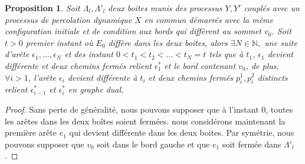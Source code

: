 \documentclass[titlepage,a4paper,12pt]{article}
\newcounter{prop}
\newtheorem{chaine}[prop]{Proposition}
\begin{document}
\begin{chaine}
\label{chaine}
Soit $\Lambda_l, \Lambda'_l$ deux boites munis des processus $Y,Y'$ couplés avec un processus de percolation dynamique $X$ en commun démarrés avec la même configuration initiale et de condition aux bords qui diffèrent au sommet $v_0$. Soit $t>0$ premier instant où $E_0$ diffère dans les deux boites, alors $\exists N\in \mathbb{N},$ une suite d'arête $\epsilon_1,\dots,\epsilon_N$ et des instant $0<t_1< t_2<\dots<t_N=t$ tels que à $t_1$, $\epsilon_1$ devient différente et deux chemins fermés relient $\epsilon_1^*$ et le bord contenant $v_0$, de plus, $\forall i>1$, l'arête $\epsilon_i$ devient différente à $t_i$ et deux chemins fermés $p_i^1,p_i^2$ distincts relient $\epsilon_{i-1}^*$ et $\epsilon_i^*$ en graphe dual.
\end{chaine}
\begin{proof}
Sans perte de généralité, nous pouvons supposer que à l'instant 0, toutes les arêtes dans les deux boîtes soient fermées. nous considérons maintenant la première arête $e_1$ qui devient différente dans les deux boites. Par symétrie, nous pouvons supposer que $v_0$ soit dans le bord gauche et que $e_1$ soit fermée dans $\Lambda'_l$.


\end{proof}
\end{document}
